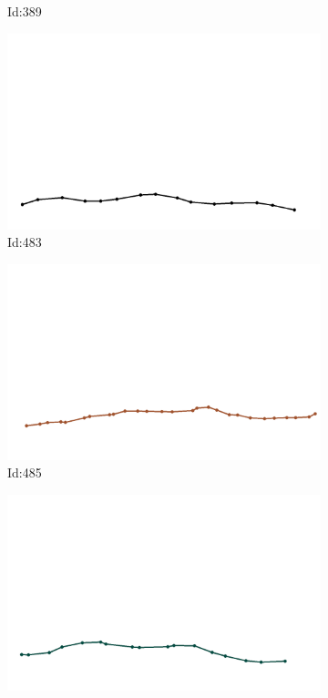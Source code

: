 \documentclass[12pt,twoside]{report}
\begin{document}
\begin{figure}
\begin{subfigure}[b]{0.20\textwidth}
\caption{Id:389}
\end{subfigure}
\begin{subfigure}[b]{0.20\textwidth}
\centering
\includegraphics[width=\textwidth]{../trajectories/483.png}
\caption{Id:483}
\end{subfigure}
\begin{subfigure}[b]{0.20\textwidth}
\centering
\includegraphics[width=\textwidth]{../trajectories/485.png}
\caption{Id:485}
\end{subfigure}
\begin{subfigure}[b]{0.20\textwidth}
\centering
\includegraphics[width=\textwidth]{../trajectories/486.png}

\end{subfigure}
\end{figure}
\end{document}
